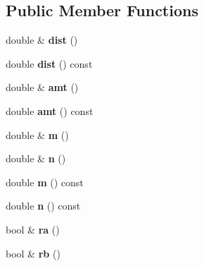 \subsection*{Public Member Functions}
\begin{DoxyCompactItemize}
\item 
\hypertarget{classvsr_1_1_knot_a26376a768ae2fe41ac805bff3691cb67}{double \& {\bfseries dist} ()}\label{classvsr_1_1_knot_a26376a768ae2fe41ac805bff3691cb67}

\item 
\hypertarget{classvsr_1_1_knot_ae743f32fa34f4afa2c184dc13ac55efd}{double {\bfseries dist} () const }\label{classvsr_1_1_knot_ae743f32fa34f4afa2c184dc13ac55efd}

\item 
\hypertarget{classvsr_1_1_knot_a2b9cca40142244a60faca62cee8b9c54}{double \& {\bfseries amt} ()}\label{classvsr_1_1_knot_a2b9cca40142244a60faca62cee8b9c54}

\item 
\hypertarget{classvsr_1_1_knot_ac5e3d9bbf7932cc6a902a7ded3079afe}{double {\bfseries amt} () const }\label{classvsr_1_1_knot_ac5e3d9bbf7932cc6a902a7ded3079afe}

\item 
\hypertarget{classvsr_1_1_knot_a1c6e4c694b56cd410c193752483a3be0}{double \& {\bfseries m} ()}\label{classvsr_1_1_knot_a1c6e4c694b56cd410c193752483a3be0}

\item 
\hypertarget{classvsr_1_1_knot_a5e0a14bf40440a7e2f6fd0f8512e9bee}{double \& {\bfseries n} ()}\label{classvsr_1_1_knot_a5e0a14bf40440a7e2f6fd0f8512e9bee}

\item 
\hypertarget{classvsr_1_1_knot_a57e7ad054d95f06c44deac30d2a0094f}{double {\bfseries m} () const }\label{classvsr_1_1_knot_a57e7ad054d95f06c44deac30d2a0094f}

\item 
\hypertarget{classvsr_1_1_knot_a2db0c95f47297c86fcf06f8b4c074d4c}{double {\bfseries n} () const }\label{classvsr_1_1_knot_a2db0c95f47297c86fcf06f8b4c074d4c}

\item 
\hypertarget{classvsr_1_1_knot_a93b386615926326ad090c074818a9b0e}{bool \& {\bfseries ra} ()}\label{classvsr_1_1_knot_a93b386615926326ad090c074818a9b0e}

\item 
\hypertarget{classvsr_1_1_knot_a1c389486634288f9008c4d79e072b4a3}{bool \& {\bfseries rb} ()}\label{classvsr_1_1_knot_a1c389486634288f9008c4d79e072b4a3}


\end{DoxyCompactItemize}
